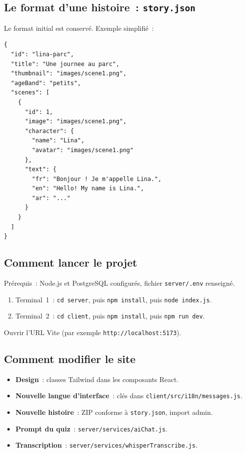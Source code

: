 \documentclass[12pt,twoside,letterpaper]{article}
\begin{document}
\subsection{Le format d'une histoire~: \texttt{story.json}}
Le format initial est conservé. Exemple simplifié~:

\begin{verbatim}
{
  "id": "lina-parc",
  "title": "Une journee au parc",
  "thumbnail": "images/scene1.png",
  "ageBand": "petits",
  "scenes": [
    {
      "id": 1,
      "image": "images/scene1.png",
      "character": {
        "name": "Lina",
        "avatar": "images/scene1.png"
      },
      "text": {
        "fr": "Bonjour ! Je m'appelle Lina.",
        "en": "Hello! My name is Lina.",
        "ar": "..."
      }
    }
  ]
}
\end{verbatim}

\subsection{Comment lancer le projet}
Prérequis~: Node.js et PostgreSQL configurés, fichier \texttt{server/.env} renseigné.
\begin{enumerate}
    \item Terminal~1~: \texttt{cd server}, puis \texttt{npm install}, puis \texttt{node index.js}.
    \item Terminal~2~: \texttt{cd client}, puis \texttt{npm install}, puis \texttt{npm run dev}.
\end{enumerate}
Ouvrir l'URL Vite (par exemple \texttt{http://localhost:5173}).

\subsection{Comment modifier le site}
\begin{itemize}
    \item \textbf{Design}~: classes Tailwind dans les composants React.
    \item \textbf{Nouvelle langue d'interface}~: clés dans \texttt{client/src/i18n/messages.js}.
    \item \textbf{Nouvelle histoire}~: ZIP conforme à \texttt{story.json}, import admin.
    \item \textbf{Prompt du quiz}~: \texttt{server/services/aiChat.js}.
    \item \textbf{Transcription}~: \texttt{server/services/whisperTranscribe.js}.
\end{itemize}
\end{document}

